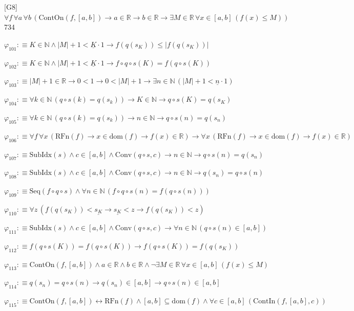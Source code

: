 \begin{fullproof}{[G8]}{$\forall f\,\forall a\,\forall b\,(\mathrm{ContOn}(f,[a,b]) \to a \in \mathbb{R} \to b \in \mathbb{R} \to \exists M \in \mathbb{R}\,\forall x \in [a,b]\,(f(x) \leq M))$}{734}
\begin{abbrevlist}
\item $\varphi_{101} :\equiv K \in \mathbb{N} \land \lvert M \rvert + 1 < \underline{K} \cdot 1 \to f(q(s_{K})) \leq \lvert f(q(s_{K})) \rvert$
\item $\varphi_{102} :\equiv K \in \mathbb{N} \land \lvert M \rvert + 1 < \underline{K} \cdot 1 \to f \circ q \circ s(K) = f(q \circ s(K))$
\item $\varphi_{103} :\equiv \lvert M \rvert + 1 \in \mathbb{R} \to 0 < 1 \to 0 < \lvert M \rvert + 1 \to \exists n \in \mathbb{N}\,(\lvert M \rvert + 1 < \underline{n} \cdot 1)$
\item $\varphi_{104} :\equiv \forall k \in \mathbb{N}\,(q \circ s(k) = q(s_{k})) \to K \in \mathbb{N} \to q \circ s(K) = q(s_{K})$
\item $\varphi_{105} :\equiv \forall k \in \mathbb{N}\,(q \circ s(k) = q(s_{k})) \to n \in \mathbb{N} \to q \circ s(n) = q(s_{n})$
\item $\varphi_{106} :\equiv \forall f\,\forall x\,(\mathrm{RFn}(f) \to x \in \mathrm{dom}(f) \to f(x) \in \mathbb{R}) \to \forall x\,(\mathrm{RFn}(f) \to x \in \mathrm{dom}(f) \to f(x) \in \mathbb{R})$
\item $\varphi_{107} :\equiv \mathrm{SubIdx}(s) \land c \in [a,b] \land \mathrm{Conv}(q \circ s,c) \to n \in \mathbb{N} \to q \circ s(n) = q(s_{n})$
\item $\varphi_{108} :\equiv \mathrm{SubIdx}(s) \land c \in [a,b] \land \mathrm{Conv}(q \circ s,c) \to n \in \mathbb{N} \to q(s_{n}) = q \circ s(n)$
\item $\varphi_{109} :\equiv \mathrm{Seq}(f \circ q \circ s) \land \forall n \in \mathbb{N}\,(f \circ q \circ s(n) = f(q \circ s(n)))$
\item $\varphi_{110} :\equiv \forall z\,(f(q(s_{K})) < \underline{s_{K}} \to \underline{s_{K}} < z \to f(q(s_{K})) < z)$
\item $\varphi_{111} :\equiv \mathrm{SubIdx}(s) \land c \in [a,b] \land \mathrm{Conv}(q \circ s,c) \to \forall n \in \mathbb{N}\,(q \circ s(n) \in [a,b])$
\item $\varphi_{112} :\equiv f(q \circ s(K)) = f(q \circ s(K)) \to f(q \circ s(K)) = f(q(s_{K}))$
\item $\varphi_{113} :\equiv \mathrm{ContOn}(f,[a,b]) \land a \in \mathbb{R} \land b \in \mathbb{R} \land \neg \exists M \in \mathbb{R}\,\forall x \in [a,b]\,(f(x) \leq M)$
\item $\varphi_{114} :\equiv q(s_{n}) = q \circ s(n) \to q(s_{n}) \in [a,b] \to q \circ s(n) \in [a,b]$
\item $\varphi_{115} :\equiv \mathrm{ContOn}(f,[a,b]) \leftrightarrow \mathrm{RFn}(f) \land [a,b] \subseteq \mathrm{dom}(f) \land \forall c \in [a,b]\,(\mathrm{ContIn}(f,[a,b],c))$

\end{abbrevlist}
\end{fullproof}
